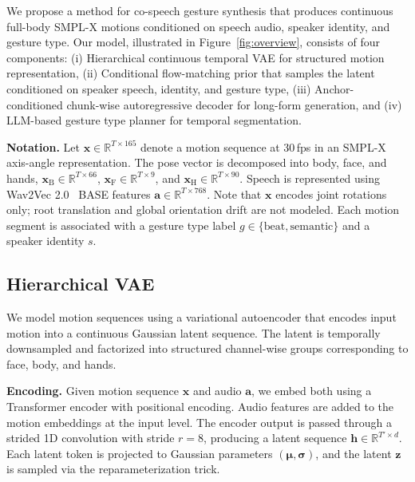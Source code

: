 We propose a method for co-speech gesture synthesis that produces continuous full-body SMPL-X motions conditioned on speech audio, speaker identity, and gesture type.
Our model, illustrated in Figure~\ref{fig:overview}, consists of four components: (i) Hierarchical continuous temporal VAE for structured motion representation, (ii) Conditional flow-matching prior that samples the latent conditioned on speaker speech, identity, and gesture type, (iii) Anchor-conditioned chunk-wise autoregressive decoder for long-form generation, and (iv) LLM-based gesture type planner for temporal segmentation.

\noindent \textbf{Notation.}
Let $\mathbf{x} \in \mathbb{R}^{T \times 165}$ denote a motion sequence at 30\,fps in an SMPL-X axis-angle representation.
The pose vector is decomposed into body, face, and hands,
$\mathbf{x}_\text{B} \in \mathbb{R}^{T \times 66}$, $\mathbf{x}_\text{F} \in \mathbb{R}^{T \times 9}$, and $\mathbf{x}_\text{H} \in \mathbb{R}^{T \times 90}$.
Speech is represented using Wav2Vec 2.0~\cite{wav2vec2} BASE features
$\mathbf{a} \in \mathbb{R}^{T \times 768}$.
Note that $\mathbf{x}$ encodes joint rotations only; root translation and global orientation drift are not modeled.
Each motion segment is associated with a gesture type label $g \in \{\text{beat}, \text{semantic}\}$ and a speaker identity $s$.

\subsection{Hierarchical VAE}
\label{sec:vae}
We model motion sequences using a variational autoencoder that encodes input motion into a continuous Gaussian latent sequence.
The latent is temporally downsampled and factorized into structured channel-wise groups corresponding to face, body, and hands.

\noindent \textbf{Encoding.}
Given motion sequence $\mathbf{x}$ and audio $\mathbf{a}$, we embed both using a Transformer encoder with positional encoding.
Audio features are added to the motion embeddings at the input level.
The encoder output is passed through a strided 1D convolution with stride $r=8$, producing a latent sequence $\mathbf{h} \in \mathbb{R}^{T' \times d}$.
Each latent token is projected to Gaussian parameters $(\boldsymbol{\mu}, \boldsymbol{\sigma})$, and the latent $\mathbf{z}$ is sampled via the reparameterization trick.

